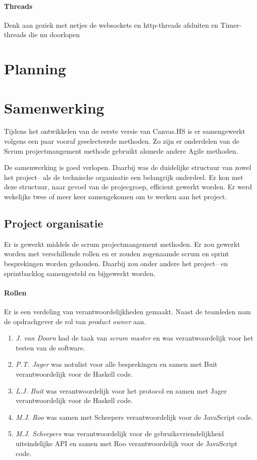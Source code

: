 \paragraph{Threads}
Denk aan geziek met netjes de websockets en http-threads afsluiten en Timer-threads die nu doorlopen

\section{Planning}
\section{Samenwerking}
Tijdens het ontwikkelen van de eerste versie van Canvas.HS is er samengewerkt volgens een paar vooraf geselecteerde methoden. Zo zijn er onderdelen van de Scrum projectmangement methode gebruikt alsmede andere Agile methoden.

De samenwerking is goed verlopen. Daarbij was de duidelijke structuur van zowel het project– als de technische organisatie een belangrijk onderdeel. Er kon met deze structuur, naar gevoel van de projecgroep, efficient gewerkt worden. Er werd wekelijks twee of meer keer samengekomen om te werken aan het project.

\subsection{Project organisatie}
Er is gewerkt middels de scrum projectmangement methoden. Er zou gewerkt worden met verschillende rollen en er zouden zogenaamde scrum en sprint besprekingen worden gehouden. Daarbij zou onder andere het project– en sprintbacklog samengesteld en bijgewerkt worden.

\paragraph{Rollen} Er is een verdeling van verantwoordelijkheden gemaakt. Naast de teamleden nam de opdrachgever de rol van \emph{product owner} aan.
\begin{enumerate}
    \item \emph{J. van Doorn} had de taak van \emph{scrum master} en was verantwoordelijk voor het testen van de software.
    \item \emph{P.T. Jager} was notulist voor alle besprekingen en samen met Buit verantwoordelijk voor de Haskell code.
    \item \emph{L.J. Buit} was verantwoordelijk voor het protocol en samen met Jager verantwoordelijk voor de Haskell code.
    \item \emph{M.J. Roo} was samen met Scheepers verantwoordelijk voor de JavaScript code.
    \item \emph{M.J. Scheepers} was verantwoordelijk voor de gebruiksvriendelijkheid uiteindelijke API en samen met Roo verantwoordelijk voor de JavaScript code.
\end{enumerate}

